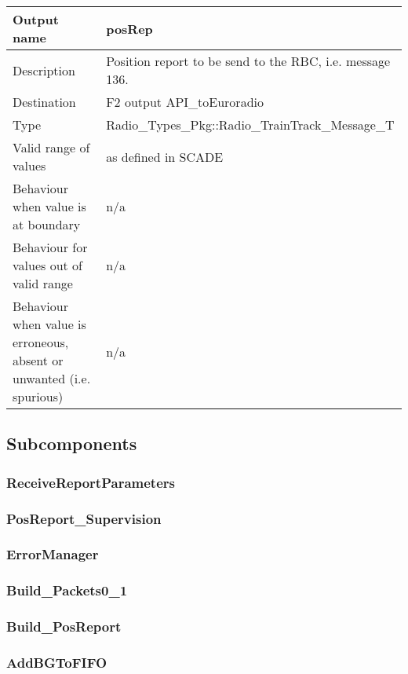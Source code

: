 \begin{longtable}{p{}p{}}
\toprule
Output name				& posRep \\
\midrule
Description				& Position report to be send to the RBC, i.e. message 136. \\
\midrule
Destination				& F2 output API\_toEuroradio \\ 
\midrule
Type					& Radio\_Types\_Pkg::Radio\_TrainTrack\_Message\_T \\
\midrule
Valid range of values	& as defined in SCADE \\
\midrule
Behaviour when value is at boundary	& n/a \\
\midrule
Behaviour for values out of valid range	& n/a \\
\midrule
Behaviour when value is erroneous, absent or unwanted (i.e. spurious) & n/a \\
\bottomrule
\end{longtable}


\subsection{Subcomponents}\label{s:provide_position_report_subcomponents}


\subsubsection{ReceiveReportParameters}


\subsubsection{PosReport\_Supervision}


\subsubsection{ErrorManager}


\subsubsection{Build\_Packets0\_1}


\subsubsection{Build\_PosReport}


\subsubsection{AddBGToFIFO}


